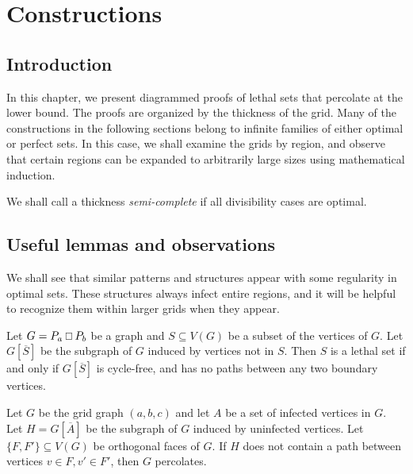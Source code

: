\chapter{Constructions}

\section{Introduction}

In this chapter, we present diagrammed proofs of lethal sets that percolate at the lower bound. The proofs are organized by the thickness of the grid. Many of the constructions in the following sections belong to infinite families of either optimal or perfect sets. In this case, we shall examine the grids by region, and observe that certain regions can be expanded to arbitrarily large sizes using mathematical induction. 

We shall call a thickness \emph{semi-complete} if all divisibility cases are optimal.

\section{Useful lemmas and observations}

We shall see that similar patterns and structures appear with some regularity in optimal sets. These structures always infect entire regions, and it will be helpful to recognize them within larger grids when they appear. 

\begin{lem}
\label{lem:forest}
Let $G = P_a \Osq P_b$ be a graph and $S \subseteq V(G)$ be a subset of the vertices of $G$. Let $G[\overline{S}]$ be the subgraph of $G$ induced by vertices not in $S$. Then $S$ is a lethal set if and only if $G[\overline{S}]$ is cycle-free, and has no paths between any two boundary vertices. 
\end{lem}

\begin{lem}
\label{lem:walls}
Let $G$ be the grid graph $(a,b,c)$ and let $A$ be a set of infected vertices in $G$. Let $H = G[\overline{A}]$ be the subgraph of $G$ induced by uninfected vertices. Let $\{F, F'\} \subseteq V(G)$ be orthogonal faces of $G$. If $H$ does not contain a path between vertices $v \in F, v' \in F'$, then $G$ percolates.
\end{lem}

